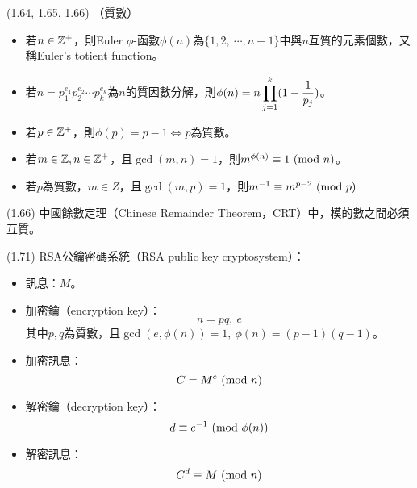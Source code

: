 \item \begin{theorem}{(1.64, 1.65, 1.66)} （質數）
    \begin{itemize}
        \item 若$n \in \mathbb{Z}^+$，則Euler $\phi$-函數$\phi(n)$為$\{1, 2, \ \cdots, n - 1\}$中與$n$互質的元素個數，又稱Euler's totient function。
        \item 若$n = p_1^{e_1}p_2^{e_2}\cdots p_k^{e_k}$為$n$的質因數分解，則$\phi(n) = n\displaystyle \prod_{j = 1}^{k}(1 - \frac{1}{p_j})$。
        \item 若$p \in \mathbb{Z}^+$，則$\phi(p) = p - 1$$\iff$$p$為質數。
        \item 若$m \in \mathbb{Z}, n \in \mathbb{Z}^+$，且$\gcd(m, n) = 1$，則$m^{\phi(n)} \equiv 1 \ (\mathrm{mod}\ n)$。
        \item 若$p$為質數，$m \in Z$，且$\gcd(m, p) = 1$，則$m^{-1} \equiv m^{p - 2} \ (\mathrm{mod}\ p)$
    \end{itemize}
\end{theorem}

\item \begin{theorem}{(1.66)} 中國餘數定理（Chinese Remainder Theorem，CRT）中，模的數之間必須互質。
\end{theorem}

\item \begin{theorem}{(1.71)} RSA公鑰密碼系統（RSA public key cryptosystem）：\begin{itemize}
        \item 訊息：$M$。
        \item 加密鑰（encryption key）：\begin{equation}
            n = pq, \ e
        \end{equation}
        其中$p, q$為質數，且$\gcd(e, \phi(n)) = 1, \ \phi(n) = (p - 1)(q - 1)$。
        \item 加密訊息：\begin{equation}
            C = M^e \ (\mathrm{mod}\ n)
        \end{equation}
        \item 解密鑰（decryption key）：\begin{equation}
            d \equiv e^{-1} \ (\mathrm{mod}\ \phi(n))
        \end{equation}
        \item 解密訊息：\begin{equation}
            C^d \equiv M \ (\mathrm{mod}\ n)
        \end{equation}
    \end{itemize}
\end{theorem}
